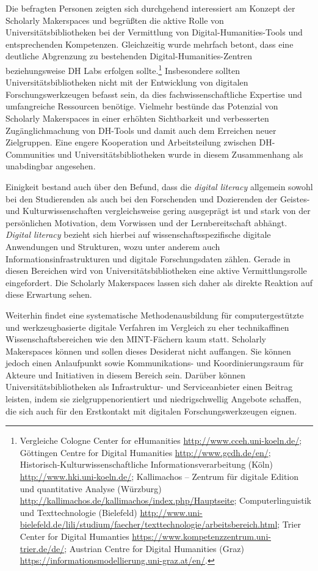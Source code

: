 \documentclass[a4paper,
fontsize=11pt,
oneside,
numbers=noperiodatend,
parskip=half-,
bibliography=totoc,
final
]{scrartcl}
\begin{document}
Die befragten Personen zeigten sich durchgehend interessiert am Konzept
der Scholarly Makerspaces und begrüßten die aktive Rolle von
Universitätsbibliotheken bei der Vermittlung von
Digital-Humanities-Tools und entsprechenden Kompetenzen. Gleichzeitig
wurde mehrfach betont, dass eine deutliche Abgrenzung zu bestehenden
Digital-Humanities-Zentren beziehungsweise DH Labs erfolgen
sollte.\footnote{Vergleiche Cologne Center for eHumanities
  \url{http://www.cceh.uni-koeln.de/}; Göttingen Centre for Digital
  Humanities \url{http://www.gcdh.de/en/};
  Historisch-Kulturwissenschaftliche Informationsverarbeitung (Köln)
  \url{http://www.hki.uni-koeln.de/}; Kallimachos -- Zentrum für
  digitale Edition und quantitative Analyse (Würzburg)
  \url{http://kallimachos.de/kallimachos/index.php/Hauptseite};
  Computerlinguistik und Texttechnologie (Bielefeld)
  \url{http://www.uni-bielefeld.de/lili/studium/faecher/texttechnologie/arbeitsbereich.html};
  Trier Center for Digital Humanties
  \url{https://www.kompetenzzentrum.uni-trier.de/de/}; Austrian Centre
  for Digital Humanities (Graz)
  \url{https://informationsmodellierung.uni-graz.at/en/}.} Insbesondere
sollten Universitätsbibliotheken nicht mit der Entwicklung von digitalen
Forschungswerkzeugen befasst sein, da dies fachwissenschaftliche
Expertise und umfangreiche Ressourcen benötige. Vielmehr bestünde das
Potenzial von Scholarly Makerspaces in einer erhöhten Sichtbarkeit und
verbesserten Zugänglichmachung von DH-Tools und damit auch dem Erreichen
neuer Zielgruppen. Eine engere Kooperation und Arbeitsteilung zwischen
DH-Communities und Universitätsbibliotheken wurde in diesem Zusammenhang
als unabdingbar angesehen.

Einigkeit bestand auch über den Befund, dass die \emph{digital literacy}
allgemein sowohl bei den Studierenden als auch bei den Forschenden und
Dozierenden der Geistes- und Kulturwissenschaften vergleichsweise gering
ausgeprägt ist und stark von der persönlichen Motivation, dem Vorwissen
und der Lernbereitschaft abhängt. \emph{Digital literacy} bezieht sich
hierbei auf wissenschaftsspezifische digitale Anwendungen und
Strukturen, wozu unter anderem auch Informationsinfrastrukturen und
digitale Forschungsdaten zählen. Gerade in diesen Bereichen wird von
Universitätsbibliotheken eine aktive Vermittlungsrolle eingefordert. Die
Scholarly Makerspaces lassen sich daher als direkte Reaktion auf diese
Erwartung sehen.

Weiterhin findet eine systematische Methodenausbildung für
computergestützte und werkzeugbasierte digitale Verfahren im Vergleich
zu eher technikaffinen Wissenschaftsbereichen wie den MINT-Fächern kaum
statt. Scholarly Makerspaces können und sollen dieses Desiderat nicht
auffangen. Sie können jedoch einen Anlaufpunkt sowie Kommunikations- und
Koordinierungsraum für Akteure und Initiativen in diesem Bereich sein.
Darüber können Universitätsbibliotheken als Infrastruktur- und
Serviceanbieter einen Beitrag leisten, indem sie zielgruppenorientiert
und niedrigschwellig Angebote schaffen, die sich auch für den
Erstkontakt mit digitalen Forschungswerkzeugen eignen.
\end{document}
